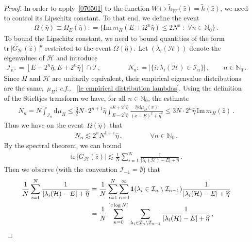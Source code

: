 \documentclass[10pt,reqno]{amsart}
\numberwithin{equation}{section}
\theoremstyle{plain}
\numberwithin{kevin}{section}
\theoremstyle{remark}
\renewcommand{\Im}{\mathrm{Im}\,}
\newcommand{\im}{\mathrm{Im}\,}
\newcommand{\N}{{\mathbb N}}
\newcommand{\ii}{\mathrm{i}}
\newcommand{\deq}{\mathrel{\mathop:}=}
\newcommand{\ntr}{\mathrm{tr}\,}
\newcommand{\dd}{\mathrm{d}}
\newcommand{\cf}{\emph{c.f., }}
\begin{document}
\begin{proof}
In order to apply~\eqref{070501} to the function $W\mapsto\widetilde{h}_W(\widehat{z}) = \widetilde{h}(\widehat{z})$, we need to control its Lipschitz constant. To that end, we define the event  
\begin{align}
\Omega(\widehat{\eta})\equiv \Omega_E(\widehat{\eta})\deq \big\{ \Im m_H (E+\ii2^{n}\widehat{\eta})\leq 2N^\varepsilon \; : \; \forall n\in \N_0 \big\}\,.\label{071101}
\end{align} 
To bound the Lipschitz constant, we need to bound quantities of the form $\ntr |G_{\mathcal{H}}(\widehat{z})|^k$ restricted to the event $\Omega(\widehat{\eta})$. Let $(\lambda_i(\mathcal{H}))$ denote the eigenvalues of $\mathcal{H}$ and introduce
\begin{eqnarray*}
\mathcal{I}_n\deq[E-2^n\widehat{\eta}, E+2^n \widehat{\eta}]\cap\mathcal{I}\,,\qquad\qquad N_n\deq|\{i:\lambda_i(\mathcal{H})\in \mathcal{I}_n\}|\,,\qquad n\in\N_0\,.
\end{eqnarray*}
Since $H$ and $\mathcal{H}$ are unitarily equivalent, their
 empirical eigenvalue distributions are the same,~$\mu_H$;  \cf~\eqref{le empirical distribution lambdas}. Using the definition of the Stieltjes transform we have, for all $n\in\N_0$, the estimate
\begin{align*}
 N_n=N\int_{\mathcal{I}_n}\dd \mu_{H}\le\frac{3}{2}N\cdot 2^{n+1}\widehat\eta\int_{E-2^n\widehat{\eta}}^{E+2^n\widehat{\eta}}\frac{\widehat\eta\,\dd\mu_{ H}(x)}{(x-E)^2+\widehat\eta^2}\le 3N\cdot 2^n\widehat\eta\,\im m_{H}(\widehat z)\,.
\end{align*}
Thus we have on the event~$\Omega(\widehat{\eta})$ that
\begin{eqnarray}
N_n\lesssim 2^{n}N^{1+\varepsilon}\widehat{\eta}\,,\qquad \qquad\forall n\in\N_0\,. \label{070103}
\end{eqnarray}
By the spectral theorem, we can bound
\begin{align}\label{schnabel}
  \ntr |G_{\mathcal{H}}(\widehat{z})|\lesssim \frac{1}{N}\sum_{i=1}^N\frac{1}{|\lambda_i(\mathcal{H})-E|+\widehat{\eta}}\,.
\end{align}
Then we observe (with the convention $\mathcal{I}_{-1}=\emptyset$) that
\begin{align*}
  \frac{1}{N}\sum_{i=1}^N\frac{1}{|\lambda_i(\mathcal{H})-E|+\widehat{\eta}}&= \frac{1}{N}\sum_{i=1}^N\sum_{n=0}^\infty {\bf 1}(\lambda_i\in \mathcal{I}_{n}\setminus\mathcal{I}_{n-1} )\frac{1}{|\lambda_i(\mathcal{H})-E|+\widehat{\eta}}\nonumber\\
  &= \frac{1}{N}\sum_{n=0}^{\lceil c\log N\rceil}\sum_{\lambda_i\in\mathcal{I}_{n}\setminus\mathcal{I}_{n-1} } \frac{1}{|\lambda_i(\mathcal{H})-E|+\widehat{\eta}}\,,

\end{align*}
\end{proof}
\end{document}
